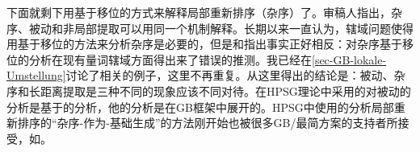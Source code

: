 
下面就剩下用基于移位的方式来解释局部重新排序（杂序）了。审稿人指出，杂序、被动和非局部提取可以用同一个机制解释。长期以来一直认为，辖域问题使得用基于移位的方法来分析杂序是必要的，但是和指出事实正好相反：对杂序基于移位的分析在现有量词辖域方面得出来了错误的推测。我已经在\ref{sec-GB-lokale-Umstellung}讨论了相关的例子，这里不再重复。从这里得出的结论是：被动、杂序和长距离提取是三种不同的现象应该不同对待。在HPSG理论中采用的对被动的分析是基于\citet{Haider86}的分析，他的分析是在GB框架中展开的。HPSG中使用的分析局部重新排序的“杂序-作为-基础生成”的方法刚开始也被很多GB/最简方案的支持者所接受，如\citet{Fanselow2001a}。


